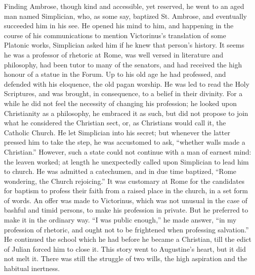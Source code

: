 Finding Ambrose, though kind and accessible, yet reserved, he went
to an aged man named Simplician, who, as some say, baptized St.
Ambrose, and eventually succeeded him in his see. He opened his mind
to him, and happening in the course of his communications to mention
Victorinus's translation of some Platonic works, Simplician asked him
if he knew that person's history. It seems he was a professor of
rhetoric at Rome, was well versed in literature and philosophy, had
been tutor to many of the senators, and had received the high honour
of a statue in the Forum. Up to his old age he had professed, and
defended with his eloquence, the old pagan worship. He was led to read
the Holy Scriptures, and was brought, in consequence, to a belief in
their divinity. For a while he did not feel the necessity of changing
his profession; he looked upon Christianity as a philosophy, he
embraced it as such, but did not propose to join what he considered
the Christian sect, or, as Christians would call it, the Catholic
Church. He let Simplician into his secret; but whenever the latter
pressed him to take the step, he was accustomed to ask, ``whether
walls made a Christian.'' However, such a state could not continue
with a man of earnest mind: the leaven worked; at length he
unexpectedly called upon Simplician to lead him to church. He
was admitted a catechumen, and in due time baptized, ``Rome
wondering, the Church rejoicing.'' It was customary at Rome for
the candidates for baptism to profess their faith from a raised place
in the church, in a set form of words. An offer was made to Victorinus,
which was not unusual in the case of bashful and timid persons, to
make his profession in private. But he preferred to make it in the
ordinary way. ``I was public enough,'' he made answer,
``in my profession of rhetoric, and ought not to be frightened
when professing salvation.'' He continued the school which he had
before he became a Christian, till the edict of Julian forced him to
close it. This story went to Augustine's heart, but it did not melt
it. There was still the struggle of two wills, the high aspiration and
the habitual inertness.

